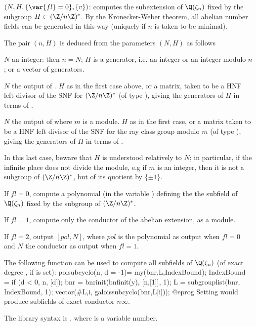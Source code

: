 $(N,H,\{\var{fl}=0\},\{v\})$: \label{se:galoissubcyclo}computes the subextension
of $\Q(\zeta_n)$ fixed by the subgroup $H \subset (\Z/n\Z)^*$. By the
Kronecker-Weber theorem, all abelian number fields can be generated in this
way (uniquely if $n$ is taken to be minimal).

\noindent The pair $(n, H)$ is deduced from the parameters $(N, H)$ as follows

\item $N$ an integer: then $n = N$; $H$ is a generator, i.e. an
integer or an integer modulo $n$; or a vector of generators.

\item $N$ the output of . $H$ as in the first case
above, or a matrix, taken to be a HNF left divisor of the SNF for $(\Z/n\Z)^*$
(of type ), giving the generators of $H$ in terms of .

\item $N$ the output of  where $m$ is a
module. $H$ as in the first case, or a matrix taken to be a HNF left
divisor of the SNF for the ray class group modulo $m$
(of type ), giving the generators of $H$ in terms of .

In this last case, beware that $H$ is understood relatively to $N$; in
particular, if the infinite place does not divide the module, e.g if $m$ is
an integer, then it is not a subgroup of $(\Z/n\Z)^*$, but of its quotient by
$\{\pm 1\}$.

If $fl=0$, compute a polynomial (in the variable ) defining the
the subfield of $\Q(\zeta_n)$ fixed by the subgroup  of $(\Z/n\Z)^*$.

If $fl=1$, compute only the conductor of the abelian extension, as a module.

If $fl=2$, output $[pol, N]$, where $pol$ is the polynomial as output when
$fl=0$ and $N$ the conductor as output when $fl=1$.

The following function can be used to compute all subfields of
$\Q(\zeta_n)$ (of exact degree , if  is set):
\bprog
polsubcyclo(n, d = -1)=
{ my(bnr,L,IndexBound);
  IndexBound = if (d < 0, n, [d]);
  bnr = bnrinit(bnfinit(y), [n,[1]], 1);
  L = subgrouplist(bnr, IndexBound, 1);
  vector(#L,i, galoissubcyclo(bnr,L[i]));
}
@eprog\noindent
Setting  would produce subfields of exact
conductor $n\infty$.

The library syntax is , where  is a variable number.

